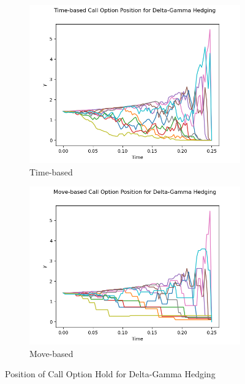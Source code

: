 \documentclass[12pt]{article}
\begin{document}
\begin{figure}[H]
  \centering
  \begin{subfigure}{.5\textwidth}
    \centering
    \includegraphics[width=\linewidth]{call-time.png}
    \caption{Time-based}
  \end{subfigure}%
  \begin{subfigure}{.5\textwidth}
    \centering
    \includegraphics[width=\linewidth]{call-move.png}
    \caption{Move-based}
  \end{subfigure}%
  \caption{Position of Call Option Hold for Delta-Gamma Hedging}
\end{figure}
\end{document}

